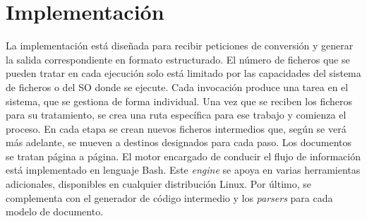 
\chapter{Implementación}
\label{chap:implemetación}

La implementación está diseñada para recibir peticiones de conversión y generar la salida correspondiente en formato estructurado. El número de ficheros que se pueden tratar en cada ejecución solo está limitado por las capacidades del sistema de ficheros o del SO donde se ejecute. Cada invocación produce una tarea en el sistema, que se gestiona de forma individual. Una vez que se reciben los ficheros para su tratamiento, se crea una ruta específica para ese trabajo y comienza el proceso. En cada etapa se crean nuevos ficheros intermedios que, según se verá más adelante, se mueven a destinos designados para cada paso. Los documentos se tratan página a página. El motor encargado de conducir el flujo de información está implementado en lenguaje Bash. Este \emph{engine} se apoya en varias herramientas adicionales, disponibles en cualquier distribución Linux. Por último, se complementa con el generador de código intermedio y los \emph{parsers} para cada modelo de documento.





